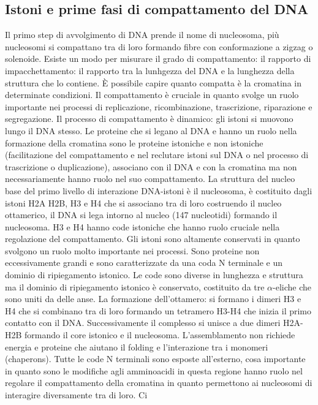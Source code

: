 \subsection{Istoni e prime fasi di compattamento del DNA}
Il primo step di avvolgimento di DNA prende il nome di nucleosoma, pi\`u nucleosomi si compattano tra di loro formando fibre con conformazione a zigzag o solenoide. Esiste un modo per
misurare il grado di compattamento: il rapporto di impacchettamento: il rapporto tra la lunhgezza del DNA e la lunghezza della struttura che lo contiene. \`E possibile capire quanto 
compatta \`e la cromatina in determinate condizioni. Il compattamento \`e cruciale in quanto svolge un ruolo importante nei processi di replicazione, ricombinazione, trascrizione, 
riparazione e segregazione. Il processo di compattamento \`e dinamico: gli istoni si muovono lungo il DNA stesso. Le proteine che si legano al DNA e hanno un ruolo nella formazione della
cromatina sono le proteine istoniche e non istoniche (facilitazione del compattamento e nel reclutare istoni sul DNA o nel processo di trascrizione o duplicazione), associano con il DNA
e con la cromatina ma non necessariamente hanno ruolo nel suo compattamento. La struttura del nucleo base del primo livello di interazione DNA-istoni \`e il nucleosoma, \`e costituito 
dagli istoni H2A H2B, H3 e H4 che si associano tra di loro costruendo il nucleo ottamerico, il DNA si lega intorno al nucleo (147 nucleotidi) formando il nucleosoma. H3 e H4 hanno code
istoniche che hanno ruolo cruciale nella regolazione del compattamento. Gli istoni sono altamente conservati in quanto svolgono un ruolo molto importante nei processi. Sono proteine 
non eccessivamente grandi e sono caratterizzate da una coda N terminale e un dominio di ripiegamento istonico. Le code sono diverse in lunghezza e struttura ma il dominio di ripiegamento
istonico \`e conservato, costituito da tre $\alpha$-eliche che sono uniti da delle anse. La formazione dell'ottamero: si formano i dimeri H3 e H4 che si combinano tra di loro formando 
un tetramero H3-H4 che inizia il primo contatto con il DNA. Successivamente il complesso si unisce a due dimeri H2A-H2B formando il core istonico e il nucleosoma. L'assemblamento non
richiede energia e proteine che aiutano il folding e l'interazione tra i monomeri (chaperons). Tutte le code N terminali sono esposte all'esterno, cosa importante in quanto sono le 
modifiche agli amminoacidi in questa regione hanno ruolo nel regolare il compattamento della cromatina in quanto permettono ai nucleosomi di interagire diversamente tra di loro. Ci 
